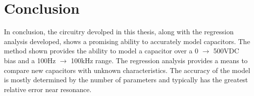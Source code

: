\section {Conclusion}

In conclusion, the circuitry devolped in this thesis, along with the regression analysis developed, shows a promising ability to accurately model capacitors. The method shown provides the ability to model a capacitor over a 0 $\rightarrow$ 500VDC bias and a 100Hz $\rightarrow$ 100kHz range. The regression analysis provides a means to compare new capacitors with unknown characteristics. The accuracy of the model is mostly determined by the number of parameters and typically has the greatest relative error near resonance.

